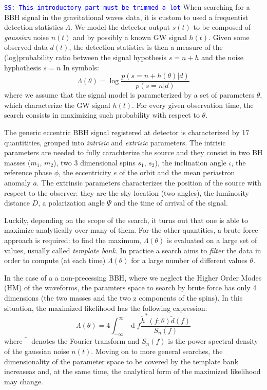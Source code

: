 \documentclass[twocolumn,showpacs,preprintnumbers,nofootinbib,prd,
superscriptaddress,10pt]{revtex4-2}
\renewcommand{\d}[1]{\ensuremath{\operatorname{d}\!{#1}}}
\newcommand{\stefano}[1]{{\textcolor{blue}{\texttt{SS: #1}} }}
\begin{document}
\stefano{This introductory part must be trimmed a lot}
When searching for a BBH signal in the gravitational waves data, it is custom to used a frequentist detection statistics $\Lambda$.
We model the detector output $s(t)$ to be composed of {\it gaussian} noise $n(t)$ and by possibly a known GW signal $h(t)$.
Given some observed data $d(t)$, the detection statistics is then a measure of the (log)probability ratio between the signal hypothesis $s = n+h$ and the noise hyphothesis $s = n$
In symbols:
\begin{equation}\label{eq:LL}
	\Lambda(\theta) = \log\frac{p(s = n+h(\theta)|d)}{p(s = n|d)}
\end{equation}
where we assume that the signal model is parameterized by a set of parameters $\theta$, which characterize the GW signal $h(t)$.
For every given observation time, the search consists in maximizing such probability with respect to $\theta$. 

The generic eccentric BBH signal registered at detector is characterized by 17 quantitities, grouped into \textit{intrisic} and \textit{extrisic} parameters.
The intrisic parameters are needed to fully carachterize the source and they consist in two BH masses ($m_1$, $m_2$), two 3 dimensional spins $s_1$, $s_2$), the inclination angle $\iota$, the reference phase $\phi$, the eccentricity $e$ of the orbit and the mean periastron anomaly $a$.
The extrinsic parameters characterizes the position of the source with respect to the observer: they are the sky location (two angles), the luminosity distance $D$, a polarization angle $\Psi$ and the time of arrival of the signal.

Luckily, depending on the scope of the search, it turns out that one is able to maximize analytically over many of them. For the other quantities, a brute force approach is required: to find the maximum, $\Lambda(\theta)$ is evaluated on a large set of values, usually called {\it template bank}. 
In practice a search aims to {\it filter} the data in order to compute (at each time) $\Lambda(\theta)$ for a large number of different values $\theta$.

In the case of a a non-precessing BBH, where we neglect the Higher Order Modes (HM) of the waveforms, the paramters space to search by brute force has only 4 dimensions (the two masses and the two z components of the spins). In this situation, the maximized likelihood has the following expression:
\begin{equation}\label{eq:LL_filtering}
	\Lambda(\theta) = 4 \int_{-\infty}^{\infty} \d{f} \frac{\tilde{h}^*(f;\theta) \tilde{d}(f)}{S_n(f)}
\end{equation}
where $\tilde{\phantom{h}}$ denotes the Fourier transform and $S_n(f)$ is the power spectral density of the gaussian noise $n(t)$.
Moving on to more general searches, the dimensionality of the parameter space to be covered by the template bank increaseas and, at the same time, the analytical form of the maximized likelihood may change.
\end{document}
